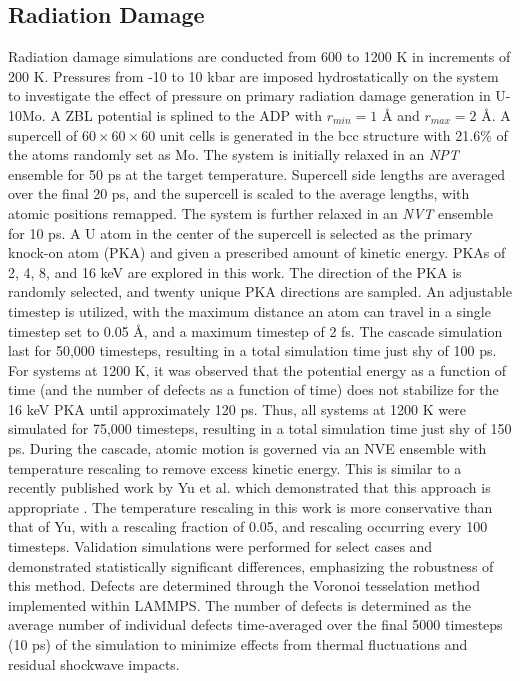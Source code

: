 \documentclass[review]{elsarticle}
\begin{document}
\subsection{Radiation Damage}

Radiation damage simulations are conducted from 600 to 1200 K in increments of 200 K. Pressures from -10 to 10 kbar are imposed hydrostatically on the system to investigate the effect of pressure on primary radiation damage generation in U-10Mo. A ZBL \cite{zbl} potential is splined to the ADP with $r_{min}=1$ {\AA} and $r_{max}=2$ {\AA}. A supercell of $60 \times 60 \times 60$ unit cells is generated in the bcc structure with 21.6\% of the atoms randomly set as Mo. The system is initially relaxed in an \textit{NPT} ensemble for 50 ps at the target temperature. Supercell side lengths are averaged over the final 20 ps, and the supercell is scaled to the average lengths, with atomic positions remapped. The system is further relaxed in an \textit{NVT} ensemble for 10 ps. A U atom in the center of the supercell is selected as the primary knock-on atom (PKA) and given a prescribed amount of kinetic energy. PKAs of 2, 4, 8, and 16 keV are explored in this work. The direction of the PKA is randomly selected, and twenty unique PKA directions are sampled. An adjustable timestep is utilized, with the maximum distance an atom can travel in a single timestep set to 0.05 {\AA}, and a maximum timestep of 2 fs. The cascade simulation last for 50,000 timesteps, resulting in a total simulation time just shy of 100 ps. For systems at 1200 K, it was observed that the potential energy as a function of time (and the number of defects as a function of time) does not stabilize for the 16 keV PKA until approximately 120 ps. Thus, all systems at 1200 K were simulated for 75,000 timesteps, resulting in a total simulation time just shy of 150 ps. During the cascade, atomic motion is governed via an NVE ensemble with temperature rescaling to remove excess kinetic energy. This is similar to a recently published work by Yu et al. which demonstrated that this approach is appropriate \cite{yu2024}. The temperature rescaling in this work is more conservative than that of Yu, with a rescaling fraction of 0.05, and rescaling occurring every 100 timesteps. Validation simulations were performed for select cases and demonstrated statistically significant differences, emphasizing the robustness of this method. Defects are determined through the Voronoi tesselation method implemented within LAMMPS. The number of defects is determined as the average number of individual defects time-averaged over the final 5000 timesteps (10 ps) of the simulation to minimize effects from thermal fluctuations and residual shockwave impacts. 
\end{document}
